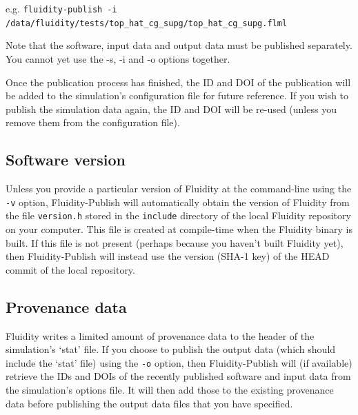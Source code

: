 \documentclass[a4paper,11pt]{report}
\begin{document}
e.g. \texttt{fluidity-publish -i /data/fluidity/tests/top\_hat\_cg\_supg/top\_hat\_cg\_supg.flml}

Note that the software, input data and output data must be published separately. You cannot yet use the -s, -i and -o options together.

Once the publication process has finished, the ID and DOI of the publication will be added to the simulation's configuration file for future reference. If you wish to publish the simulation data again, the ID and DOI will be re-used (unless you remove them from the configuration file).

\subsection{Software version}
Unless you provide a particular version of Fluidity at the command-line using the \texttt{-v} option, Fluidity-Publish will automatically obtain the version of Fluidity from the file \texttt{version.h} stored in the \texttt{include} directory of the local Fluidity repository on your computer. This file is created at compile-time when the Fluidity binary is built. If this file is not present (perhaps because you haven't built Fluidity yet), then Fluidity-Publish will instead use the version (SHA-1 key) of the HEAD commit of the local repository.

\subsection{Provenance data}
Fluidity writes a limited amount of provenance data to the header of the simulation's `stat' file. If you choose to publish the output data (which should include the `stat' file) using the \texttt{-o} option, then Fluidity-Publish will (if available) retrieve the IDs and DOIs of the recently published software and input data from the simulation's options file. It will then add those to the existing provenance data before publishing the output data files that you have specified.
\end{document}
